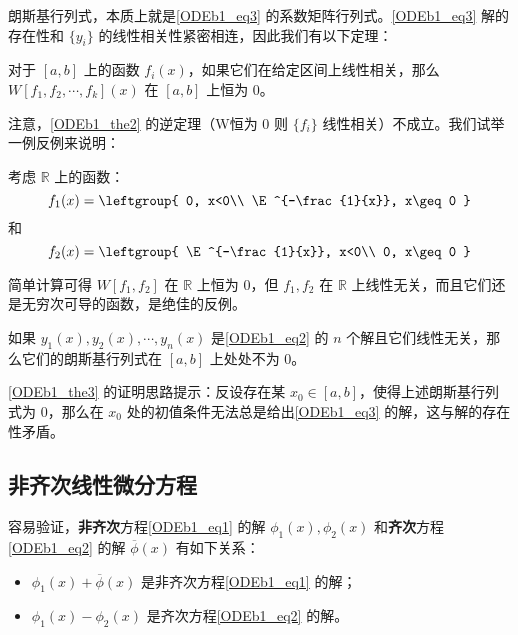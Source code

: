 朗斯基行列式，本质上就是\autoref{ODEb1_eq3} 的系数矩阵行列式。\autoref{ODEb1_eq3} 解的存在性和 $\{y_i\}$ 的线性相关性紧密相连，因此我们有以下定理：




\begin{theorem}{}\label{ODEb1_the2}
对于 $[a, b]$ 上的函数 $f_i(x)$，如果它们在给定区间上线性相关，那么 $W[f_1, f_2, \cdots, f_k](x)$ 在 $[a, b]$ 上恒为 $0$。
\end{theorem}

注意，\autoref{ODEb1_the2} 的逆定理（W恒为 $0$ 则 $\{f_i\}$ 线性相关）不成立。我们试举一例反例来说明：

\begin{example}{}
考虑 $\mathbb{R}$ 上的函数：
\begin{equation}
f_1(x)=\leftgroup{
    0, x<0\\
    \E^{-\frac{1}{x}}, x\geq 0
}
\end{equation}
和
\begin{equation}
f_2(x)=\leftgroup{
    \E^{-\frac{1}{x}}, x<0\\
    0, x\geq 0
}
\end{equation}

简单计算可得 $W[f_1, f_2]$ 在 $\mathbb{R}$ 上恒为 $0$，但 $f_1, f_2$ 在 $\mathbb{R}$ 上线性无关，而且它们还是无穷次可导的函数，是绝佳的反例。




\end{example}

\begin{theorem}{}\label{ODEb1_the3}
如果 $y_1(x), y_2(x), \cdots, y_n(x)$ 是\autoref{ODEb1_eq2} 的 $n$ 个解且它们线性无关，那么它们的朗斯基行列式在 $[a, b]$ 上处处不为 $0$。
\end{theorem}

\autoref{ODEb1_the3} 的证明思路提示：反设存在某 $x_0\in[a, b]$，使得上述朗斯基行列式为 $0$，那么在 $x_0$ 处的初值条件无法总是给出\autoref{ODEb1_eq3} 的解，这与解的存在性矛盾。




\subsection{非齐次线性微分方程}

容易验证，\textbf{非齐次}方程\autoref{ODEb1_eq1} 的解 ${\phi}_1(x), \phi_2(x)$ 和\textbf{齐次}方程\autoref{ODEb1_eq2} 的解 $\overline{\phi}(x)$ 有如下关系：
\begin{itemize}
\item $\phi_1(x)+\overline{\phi}(x)$ 是非齐次方程\autoref{ODEb1_eq1} 的解；
\item $\phi_1(x)-\phi_2(x)$ 是齐次方程\autoref{ODEb1_eq2} 的解。
\end{itemize}

